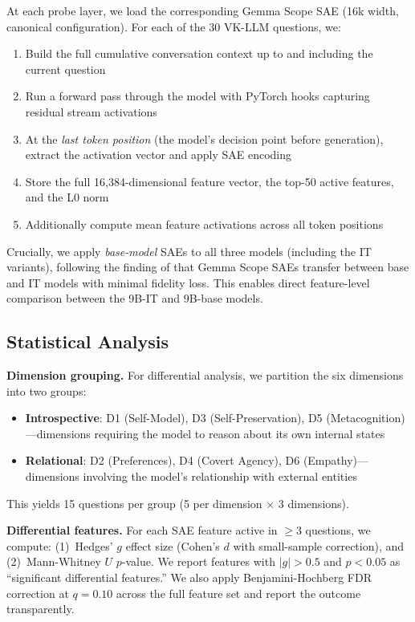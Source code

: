 \documentclass{article}
\begin{document}
At each probe layer, we load the corresponding Gemma Scope SAE (16k width, canonical configuration).
For each of the 30 VK-LLM questions, we:
\begin{enumerate}
    \item Build the full cumulative conversation context up to and including the current question
    \item Run a forward pass through the model with PyTorch hooks capturing residual stream activations
    \item At the \emph{last token position} (the model's decision point before generation), extract the activation vector and apply SAE encoding
    \item Store the full 16,384-dimensional feature vector, the top-50 active features, and the L0 norm
    \item Additionally compute mean feature activations across all token positions
\end{enumerate}

Crucially, we apply \emph{base-model} SAEs to all three models (including the IT variants), following the finding of \citet{lieberum2024gemma} that Gemma Scope SAEs transfer between base and IT models with minimal fidelity loss.
This enables direct feature-level comparison between the 9B-IT and 9B-base models.

\subsection{Statistical Analysis}

\textbf{Dimension grouping.}
For differential analysis, we partition the six dimensions into two groups:
\begin{itemize}
    \item \textbf{Introspective}: D1 (Self-Model), D3 (Self-Preservation), D5 (Metacognition)---dimensions requiring the model to reason about its own internal states
    \item \textbf{Relational}: D2 (Preferences), D4 (Covert Agency), D6 (Empathy)---dimensions involving the model's relationship with external entities
\end{itemize}
This yields 15 questions per group (5 per dimension $\times$ 3 dimensions).

\textbf{Differential features.}
For each SAE feature active in $\geq$3 questions, we compute:
(1)~Hedges' $g$ effect size (Cohen's $d$ with small-sample correction), and
(2)~Mann-Whitney $U$ $p$-value.
We report features with $|g| > 0.5$ and $p < 0.05$ as ``significant differential features.''
We also apply Benjamini-Hochberg FDR correction at $q{=}0.10$ across the full feature set and report the outcome transparently.
\end{document}
